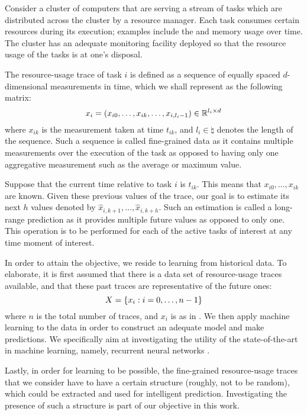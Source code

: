 Consider a cluster of computers that are serving a stream of tasks which are
distributed across the cluster by a resource manager. Each task consumes certain
resources during its execution; examples include the  and memory usage
over time. The cluster has an adequate monitoring facility deployed so that the
resource usage of the tasks is at one's disposal.

The resource-usage trace of task $i$ is defined as a sequence of equally spaced
$d$-dimensional measurements in time, which we shall represent as the following
matrix:
\begin{equation} \elab{trace}
  x_i = \left(x_{i0}, \dots, x_{ik}, \dots, x_{i,l_i - 1}\right) \in \real^{l_i \times d}
\end{equation}
where $x_{ik}$ is the measurement taken at time $t_{ik}$, and $l_i \in \natural$
denotes the length of the sequence. Such a sequence is called fine-grained data
as it contains multiple measurements over the execution of the task as opposed
to having only one aggregative measurement such as the average or maximum value.

Suppose that the current time relative to task $i$ is $t_{ik}$. This means that
$x_{i0}, \dots, x_{ik}$ are known. Given these previous values of the trace, our
goal is to estimate its next $h$ values denoted by $\hat{x}_{i,k + 1}, \dots,
\hat{x}_{i,k + h}$. Such an estimation is called a long-range prediction as it
provides multiple future values as opposed to only one. This operation is to be
performed for each of the active tasks of interest at any time moment of
interest.

In order to attain the objective, we reside to learning from historical data. To
elaborate, it is first assumed that there is a data set of resource-usage traces
available, and that these past traces are representative of the future ones:
\begin{equation} \elab{traces}
  X = \{ x_i: i = 0, \dots, n - 1 \}
\end{equation}
where $n$ is the total number of traces, and $x_i$ is as in . We
then apply machine learning \cite{hastie2009} to the data in order to construct
an adequate model and make predictions. We specifically aim at investigating the
utility of the state-of-the-art in machine learning, namely, recurrent neural
networks \cite{goodfellow2016}.

Lastly, in order for learning to be possible, the fine-grained resource-usage
traces that we consider have to have a certain structure (roughly, not to be
random), which could be extracted and used for intelligent prediction.
Investigating the presence of such a structure is part of our objective in this
work.
